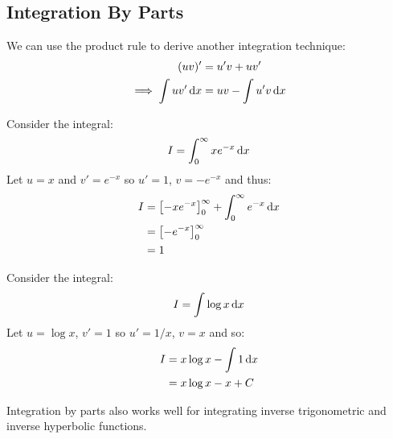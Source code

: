 \documentclass[../main.tex]{subfiles}
\begin{document}
\subsection{Integration By Parts}
We can use the product rule to derive another integration technique:
\begin{align*}
  (uv)' &= u'v + uv' \\
  \implies \int uv' \d{x} &= uv - \int u'v \d{x}
\end{align*}
\begin{example}
  Consider the integral:
  \[
    I = \int_{0}^{\infty} xe^{-x} \d{x}
  \]
  Let $u=x$ and $v'=e^{-x}$ so $u'=1$, $v=-e^{-x}$ and thus:
  \begin{align*}
    I &= \eval{-xe^{-x}}{0}{\infty} + \int_{0}^{\infty} e^{-x} \d{x} \\
      &= \eval{-e^{-x}}{0}{\infty} \\
      &= 1
  \end{align*}
\end{example}
\begin{example}
  Consider the integral:
  \[
    I = \int \log x \d{x}
  \]
  Let $u = \log x$, $v' = 1$ so $u' = 1/x$, $v = x$ and so:
  \begin{align*}
    I &= x \log x - \int 1 \d{x} \\
      &= x \log x - x + C
  \end{align*}
\end{example}
Integration by parts also works well for integrating inverse trigonometric and inverse hyperbolic functions.
\end{document}
